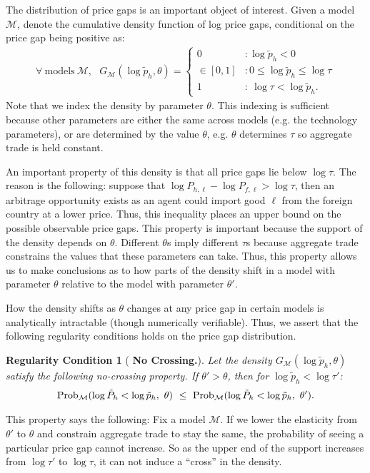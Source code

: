 \documentclass[12pt,dvips, ps2pdf]{article}
\newtheorem{reg}{Regularity Condition}
\begin{document}
The distribution of price gaps is an important object of interest. Given a model $\mathcal{M}$, denote the cumulative density function of log price gaps, conditional on the price gap being positive as:
\begin{eqnarray}
\forall \ \mathrm{models} \ \mathcal{M}, \ \ \ G_{\mathcal{M}}(\log \tilde p_h, \theta  ) = \begin{cases}
0 &: \log \tilde p_h < 0 \\
\in [0,1] &: 0 \le \log \tilde p_h \le \log \tau\\
1 &:\ \log \tau < \log \tilde p_h.
\end{cases}
\label{eq:price_gap_dist}
\end{eqnarray}
Note that we index the density by parameter $\theta$. This indexing is sufficient because other parameters are either the same across models (e.g. the technology parameters), or are determined by the value $\theta$, e.g. $\theta$ determines $\tau$ so aggregate trade is held constant.

An important property of this density is that all price gaps lie below $\log \tau$. The reason is the following: suppose that $\log P_{h,\ell}-\log P_{f,\ell} > \log \tau$, then an arbitrage opportunity exists as an agent could import good $\ell$ from the foreign country at a lower price. Thus, this inequality places an upper bound on the possible observable price gaps. This property is important because the support of the density depends on $\theta$. Different $\theta$s imply different $\tau$s because aggregate trade constrains the values that these parameters can take. Thus, this property allows us to make conclusions as to how parts of the density shift in a model with parameter $\theta$ relative to the model with parameter $\theta'$.

How the density shifts as $\theta$ changes at any price gap in certain models is analytically intractable (though numerically verifiable). Thus, we assert that the following regularity conditions holds on the price gap distribution.
\vspace{-.25cm}
\begin{reg}[ \textbf{No Crossing.}]\label{nocrossing} Let the density $G_{\mathcal{M}}(\log \tilde p_h, \theta  )$ satisfy the following no-crossing property. If $\theta' > \theta$, then for $\log \tilde p_h < \log \tau'$:
\begin{align}
\textnormal{\mbox{Prob}}_{\mathcal{M}}(\log \tilde P_{h}< \log \tilde p_h, \ \theta  ) \ \le \ \textnormal{\mbox{Prob}}_{\mathcal{M}}(\log \tilde P_{h}< \log \tilde p_h, \ \theta').
\end{align}
\end{reg}
This property says the following: Fix a model $\mathcal{M}$. If we lower the elasticity from $\theta'$ to $\theta$ and constrain aggregate trade to stay the same, the probability of seeing a particular price gap cannot increase. So as the upper end of the support increases from $\log \tau'$ to $\log \tau$, it can not induce a ``cross'' in the density.
\end{document}
